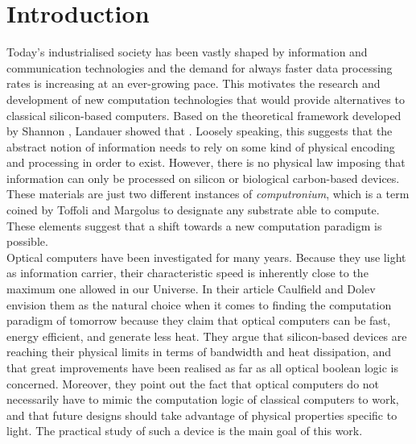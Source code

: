 \chapter{Introduction}
\label{introduction}

Today's industrialised society has been vastly shaped by information and communication technologies and the demand for always faster data processing rates is increasing at an ever-growing pace. This motivates the research and development of new computation technologies that would provide alternatives to classical silicon-based computers. Based on the theoretical framework developed by Shannon \cite{shannon1948mathematical}, Landauer showed that  \cite{Landauer1991}. Loosely speaking, this suggests that the abstract notion of information needs to rely on some kind of physical encoding and processing in order to exist. However, there is no physical law imposing that information can only be processed on silicon or biological carbon-based devices. These  materials are just two different instances of \textit{computronium}, which is a term coined by Toffoli and Margolus \cite{amato1991speculating} to designate any substrate able to compute. These elements suggest that a shift towards a new computation paradigm is possible.\\

Optical computers have been investigated for many years. Because they use light as information carrier, their characteristic speed is inherently close to the maximum one allowed in our Universe. In their article \cite{Caulfield2010} Caulfield and Dolev envision them as the natural choice when it comes to finding the computation paradigm of tomorrow because they claim that optical computers can be fast, energy efficient, and generate less heat. They argue that silicon-based devices are reaching their physical limits in terms of bandwidth and heat dissipation, and that great improvements have been realised as far as all optical boolean logic is concerned. Moreover, they point out the fact that optical computers do not necessarily have to mimic the computation logic of classical computers to work, and that future designs should take advantage of physical properties specific to light. The practical study of such a device is the main goal of this work.\\

